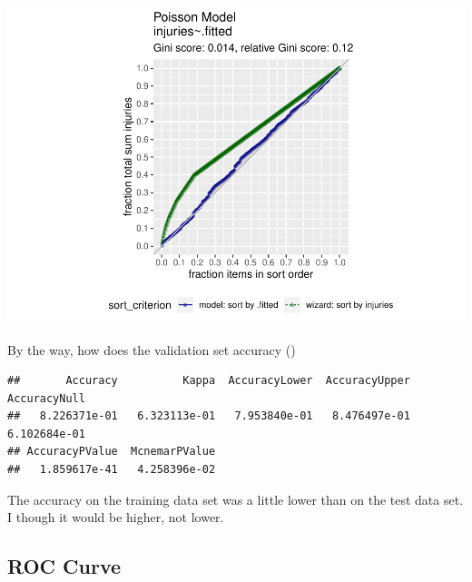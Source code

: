 \documentclass[]{book}
\newenvironment{Shaded}{\begin{snugshade}}{\end{snugshade}}
\newcommand{\DataTypeTok}[1]{\textcolor[rgb]{0.13,0.29,0.53}{#1}}
\newcommand{\KeywordTok}[1]{\textcolor[rgb]{0.13,0.29,0.53}{\textbf{#1}}}
\newcommand{\NormalTok}[1]{#1}
\newcommand{\OperatorTok}[1]{\textcolor[rgb]{0.81,0.36,0.00}{\textbf{#1}}}
\newcommand{\StringTok}[1]{\textcolor[rgb]{0.31,0.60,0.02}{#1}}
\begin{document}
\includegraphics{data-sci_files/figure-latex/unnamed-chunk-42-1.pdf}

By the way, how does the validation set accuracy ()

\begin{Shaded}
\end{Shaded}

\begin{verbatim}
##       Accuracy          Kappa  AccuracyLower  AccuracyUpper   AccuracyNull 
##   8.226371e-01   6.323113e-01   7.953840e-01   8.476497e-01   6.102684e-01 
## AccuracyPValue  McnemarPValue 
##   1.859617e-41   4.258396e-02
\end{verbatim}

The accuracy on the training data set was a little lower than on the test data set. I though it would be higher, not lower.

\hypertarget{roc-curve}{%
\subsection{ROC Curve}\label{roc-curve}}
\end{document}
